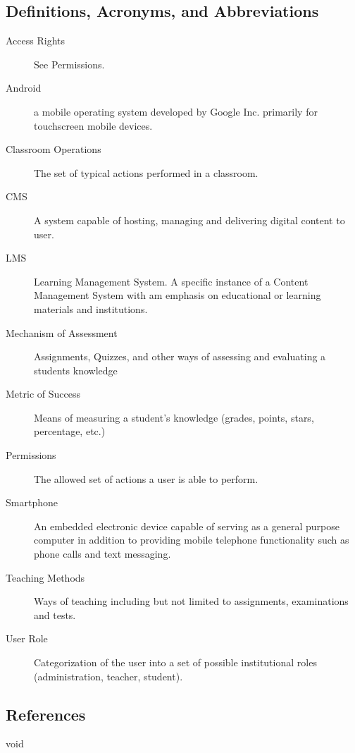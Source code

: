 \documentclass[]{article}
\begin{document}
\subsection{Definitions, Acronyms, and Abbreviations}
\label{sub:definitions_acronyms_and_abbreviations}
\begin{description}
  \item [Access Rights] See Permissions.

  \item [Android] a mobile operating system developed by Google Inc.  primarily
    for touchscreen mobile devices.

  \item [Classroom Operations] The set of typical actions performed in a
    classroom.

  \item [CMS] A system capable of hosting, managing and delivering digital
    content to user.

  \item [LMS] Learning Management System. A specific instance of a Content
    Management System with am emphasis on educational or learning materials and
    institutions.

  \item [Mechanism of Assessment] Assignments, Quizzes, and other ways of
    assessing and evaluating a students knowledge

  \item [Metric of Success] Means of measuring a student's knowledge (grades,
    points, stars, percentage, etc.)

  \item [Permissions] The allowed set of actions a user is able to perform.

  \item [Smartphone] An embedded electronic device capable of serving as a
    general purpose computer in addition to providing mobile telephone
    functionality such as phone calls and text messaging.

  \item [Teaching Methods] Ways of teaching including but not limited to
    assignments, examinations and tests.

  \item [User Role] Categorization of the user into a set of possible
    institutional roles (administration, teacher, student).
\end{description}


\subsection{References}
\label{sub:references}
void
\end{document}
